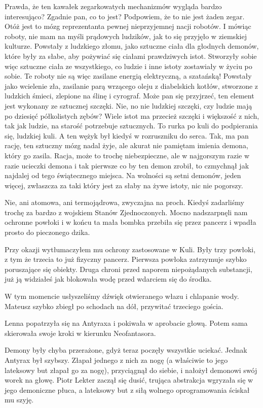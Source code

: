 Prawda, że ten kawałek zegarkowatych mechanizmów wygląda bardzo interesująco? 
Zgadnie pan, co to jest? Podpowiem, że to nie jest żaden zegar.
Otóż jest to mózg reprezentanta pewnej nieprzyjemnej nacji robotów.
I mówiąc roboty, nie mam na myśli prądowych ludzików, jak to się przyjęło w ziemskiej kulturze.
Powstały z ludzkiego złomu, jako sztuczne ciała dla głodnych demonów, które były za słabe, aby pożywiać się ciałami prawdziwych istot.
Stworzyły sobie więc sztuczne ciała ze wszystkiego, co ludzie i inne istoty zostawiały w życiu po sobie.
Te roboty nie są więc zasilane energią elektryczną, a szatańską!
Powstały jako wcielenie zła, zasilanie parą wrzącego oleju z diabelskich kotłów, stworzone z ludzkich śmieci, zlepione na ślinę i cyrograf.
Może pan się przyjrzeć, ten element jest wykonany ze sztucznej szczęki.
Nie, no nie ludzkiej szczęki, czy ludzie mają po dziesięć półkolistych zębów?
Wiele istot ma przecież szczęki i większość z nich, tak jak ludzie, na starość potrzebuje sztucznych.
To rurka po kuli do podpierania się, ludzkiej kuli. A ten wężyk był kiedyś w rozruszniku do serca.
Tak, ma pan rację, ten sztuczny mózg nadal żyje, ale akurat nie pamiętam imienia demona, który go zasila.
Racja, może to trochę niebezpieczne, ale w najgorszym razie w razie ucieczki demona i tak pierwsze co by ten demon zrobił, to czmychnął jak najdalej od tego świątecznego miejsca.
Na wolności są setni demonów, jeden więcej, zwłaszcza za taki który jest za słaby na żywe istoty, nic nie pogorszy.

Nie, ani atomowa, ani termojądrowa, zwyczajna na proch. Kiedyś zadarliśmy trochę za bardzo z wojskiem Stanów Zjednoczonych. 
Mocno nadszarpnęli nam ochronne powłoki i w końcu ta mała bombka przebiła się przez pancerz i wpadła prosto do pieczonego dzika.

Przy okazji wytłumaczyłem mu ochrony zastosowane w Kuli. Były trzy powłoki, z tym że trzecia to już fizyczny pancerz. 
Pierwsza powłoka zatrzymuje szybko poruszające się obiekty.
Druga chroni przed naporem niepożądanych substancji, już ją widziałeś jak blokowała wodę przed wdarciem się do środka.

W tym momencie usłyszeliśmy dźwięk otwieranego włazu i chlapanie wody.
Mateusz szybko zbiegł po schodach na dół, przywitać trzeciego gościa.

\divider{}

Lenna popatrzyła się na Antyraxa i pokiwała w aprobacie głową.
Potem sama skierowała swoje kroki w kierunku Neofantasora.

Demony były chyba przerażone, gdyż teraz poczęły wszystkie uciekać.
Jednak Antyrax był szybszy. Złapał jednego z nich za nogę (a właściwie to jego lateksowy but złapał go za nogę), przyciągnął do siebie, i nałożył demonowi swój worek na głowę.
Piotr Lekter zaczął się dusić, trująca abstrakcja wgryzała się w jego demoniczne płuca, a lateksowy but z siłą wolnego oprogramowania ściskał mu szyję.

